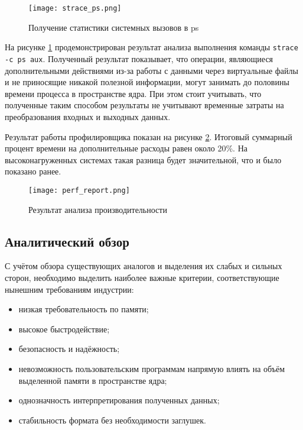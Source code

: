 \begin{figure}
  \centering
  \texttt{[image: strace\_ps.png]}
  \caption{Получение статистики системных вызовов в ps}
  \label{fig:strace_ps}
\end{figure}

На рисунке \ref{fig:strace_ps}
продемонстрирован результат анализа выполнения команды
\texttt{strace -c ps aux}. Полученный результат
показывает, что операции, являющиеся дополнительными действиями из-за работы с
данными через виртуальные файлы и не приносящие никакой полезной информации,
могут занимать до половины времени процесса в пространстве ядра. При этом стоит
учитывать, что полученные таким способом результаты не учитывают временные
затраты на преобразования входных и выходных данных. 

Результат работы профилировщика показан на рисунке \ref{fig:perf_report}.
Итоговый суммарный процент времени на дополнительные расходы равен около 20\%.
На высоконагруженных системах такая разница будет значительной, что и было
показано ранее.

\begin{figure}
  \centering
  \texttt{[image: perf\_report.png]}
  \caption{Результат анализа производительности}
  \label{fig:perf_report}
\end{figure}

\subsection{Аналитический обзор}
\label{sub:domain:analitic_overview}

С учётом обзора существующих аналогов и выделения их слабых и сильных сторон,
необходимо выделить наиболее важные критерии, соответствующие нынешним
требованиям индустрии:

\begin{itemize}
\item низкая требовательность по памяти;
\item высокое быстродействие;
\item безопасность и надёжность;
\item невозможность пользовательским программам напрямую влиять на объём
  выделенной памяти в пространстве ядра;
\item однозначность интерпретирования полученных данных;
\item стабильность формата без необходимости заглушек.
\end{itemize}


